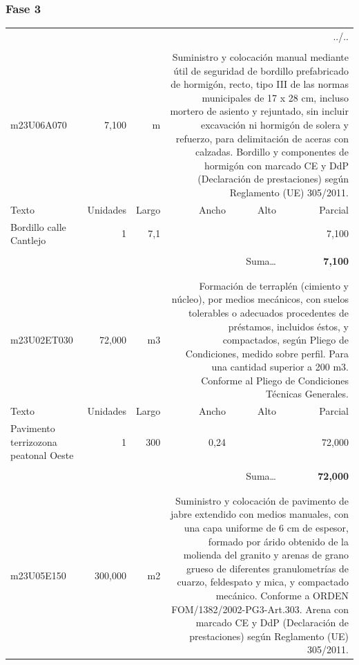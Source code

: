 \documentclass{book}%
\begin{document}
\subsubsection{Fase 3}%
\begin{longtable}{lrrrrr}%
\multicolumn{6}{r}{../..}\\%
\endfoot%
\endlastfoot%
&&&&&\\%
m23U06A070&     7,100& m&\multicolumn{3}{p{6cm}}{\scriptsize Suministro y colocación manual mediante útil de seguridad de bordillo prefabricado de hormigón, recto, tipo III de las normas municipales de 17 x 28 cm, incluso mortero de asiento y rejuntado, sin incluir excavación ni hormigón de solera y refuerzo, para delimitación de aceras con calzadas. Bordillo y componentes de hormigón con marcado CE y DdP (Declaración de prestaciones) según Reglamento (UE) 305/2011.\normalsize}\\%
Texto&Unidades&Largo&Ancho&Alto&Parcial\\%
\hline%
\multicolumn{1}{p{3.5cm}}{Bordillo calle Cantlejo}&1&7,1&&&     7,100\\%
&&&&&\\%
\multicolumn{5}{r}{Suma\ldots}&\textbf{     7,100}\\%
\hline%
&&&&&\\%
&&&&&\\%
m23U02ET030&    72,000& m3&\multicolumn{3}{p{6cm}}{\scriptsize Formación de terraplén (cimiento y núcleo), por medios mecánicos, con suelos tolerables o adecuados procedentes de préstamos, incluidos éstos, y compactados, según Pliego de Condiciones, medido sobre perfil. Para una cantidad superior a 200 m3. Conforme al Pliego de Condiciones Técnicas Generales.\normalsize}\\%
Texto&Unidades&Largo&Ancho&Alto&Parcial\\%
\hline%
\multicolumn{1}{p{3.5cm}}{Pavimento terrizozona peatonal  Oeste}&1&300&0,24&&    72,000\\%
&&&&&\\%
\multicolumn{5}{r}{Suma\ldots}&\textbf{    72,000}\\%
\hline%
&&&&&\\%
&&&&&\\%
m23U05E150&   300,000& m2&\multicolumn{3}{p{6cm}}{\scriptsize Suministro y colocación de pavimento de jabre extendido con medios manuales, con una capa uniforme de 6 cm de espesor, formado por árido obtenido de la molienda del granito y arenas de grano grueso de diferentes granulometrías de cuarzo, feldespato y mica, y compactado mecánico. Conforme a ORDEN FOM/1382/2002-PG3-Art.303. Arena con marcado CE y DdP (Declaración de prestaciones) según Reglamento (UE) 305/2011.\normalsize}\\%

\end{longtable}
\end{document}
